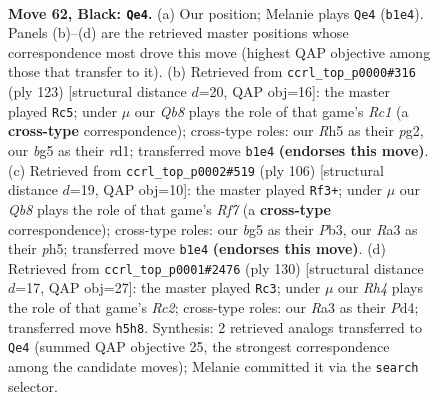 \documentclass[11pt]{article}
\begin{document}
\clearpage

\begin{figure}[p]\centering
\begin{subfigure}{0.46\textwidth}\centering
\resizebox{\linewidth}{!}{%
\newchessgame
\chessboard[
  setfen={8/3k4/3P4/1pK3Br/8/r7/8/1q6 b - - 1 62},
  showmover=false,
  pgfstyle=straightmove, color=movearrow, markmove={b1-e4}
]}
\caption{}
\end{subfigure}\hfill
\begin{subfigure}{0.46\textwidth}\centering
\resizebox{\linewidth}{!}{%
\newchessgame
\chessboard[
  setfen={2r5/8/8/8/2p1k3/2K1P3/6P1/3R4 b - - 15 62},
  showmover=false,
  pgfstyle=straightmove, color=movearrow, markmove={c8-c5}
]}
\caption{}
\end{subfigure}
\\[4pt]
\begin{subfigure}{0.46\textwidth}\centering
\resizebox{\linewidth}{!}{%
\newchessgame
\chessboard[
  setfen={8/5R2/8/7p/8/1P5k/3r1P1p/7K w - - 4 54},
  showmover=false,
  pgfstyle=straightmove, color=movearrow, markmove={f7-f3}
]}
\caption{}
\end{subfigure}\hfill
\begin{subfigure}{0.46\textwidth}\centering
\resizebox{\linewidth}{!}{%
\newchessgame
\chessboard[
  setfen={8/8/2p5/8/3P1Kp1/8/2R1bk2/8 w - - 19 66},
  showmover=false,
  pgfstyle=straightmove, color=movearrow, markmove={c2-c3}
]}
\caption{}
\end{subfigure}
\caption{\textbf{Move 62, Black: \texttt{Qe4}.} (a) Our position; Melanie plays \texttt{Qe4} (\texttt{b1e4}). Panels (b)--(d) are the retrieved master positions whose correspondence most drove this move (highest QAP objective among those that transfer to it). (b) Retrieved from \texttt{ccrl\_top\_p0000\#316} (ply 123) [structural distance $d$=20, QAP obj=16]: the master played \texttt{Rc5}; under $\mu$ our \emph{Qb8} plays the role of that game's \emph{Rc1} (a \textbf{cross-type} correspondence); cross-type roles: our \emph{R}h5 as their \emph{p}g2, our \emph{b}g5 as their \emph{r}d1; transferred move \texttt{b1e4} \textbf{(endorses this move)}. (c) Retrieved from \texttt{ccrl\_top\_p0002\#519} (ply 106) [structural distance $d$=19, QAP obj=10]: the master played \texttt{Rf3+}; under $\mu$ our \emph{Qb8} plays the role of that game's \emph{Rf7} (a \textbf{cross-type} correspondence); cross-type roles: our \emph{b}g5 as their \emph{P}b3, our \emph{R}a3 as their \emph{p}h5; transferred move \texttt{b1e4} \textbf{(endorses this move)}. (d) Retrieved from \texttt{ccrl\_top\_p0001\#2476} (ply 130) [structural distance $d$=17, QAP obj=27]: the master played \texttt{Rc3}; under $\mu$ our \emph{Rh4} plays the role of that game's \emph{Rc2}; cross-type roles: our \emph{R}a3 as their \emph{P}d4; transferred move \texttt{h5h8}. Synthesis: 2 retrieved analogs transferred to \texttt{Qe4} (summed QAP objective 25, the strongest correspondence among the candidate moves); Melanie committed it via the \texttt{search} selector.}
\label{fig:thought-m123}
\end{figure}
\end{document}
